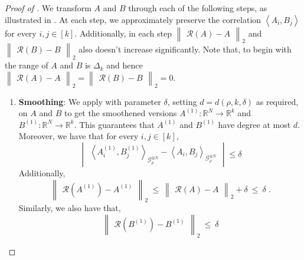 \documentclass[11pt]{article}
\newcommand{\inangle}[1]{\left \langle #1 \right \rangle}
\newcommand{\inabs}[1]{\begin{vmatrix} #1 \end{vmatrix}}
\newcommand{\norm}[2]{\begin{Vmatrix} #2 \end{Vmatrix}_{#1}}
\newcommand{\wtilde}[1]{\widetilde{#1}}
\newcommand{\bbR}{{\mathbb R}}
\newcommand{\calG}{\mathcal{G}}
\newcommand{\calR}{\mathcal{R}}
\begin{document}
\begin{proof}[Proof of ]
%
%
%

We transform $A$ and $B$ through each of the following steps, as illustrated in . At each step, we approximately preserve the correlation $\inangle{A_i, B_j}$ for every $i, j \in [k]$. Additionally, in each step $\norm{2}{\calR(A) - A}$ and $\norm{2}{\calR(B) - B}$ also doesn't increase significantly. Note that, to begin with the range of $A$ and $B$ is $\Delta_k$ and hence $\norm{2}{\calR(A) - A} = \norm{2}{\calR(B) - B} = 0$.

\begin{enumerate}
	\item {\bf Smoothing}: We apply  with parameter $\delta$, setting $d = d(\rho, k, \delta)$ as required, on $A$ and $B$ to get the smoothened versions $A^{(1)} : \bbR^N \to \bbR^k$ and $B^{(1)} : \bbR^N \to \bbR^k$. This guarantees that $A^{(1)}$ and $B^{(1)}$ have degree at most $d$. Moreover, we have that for every $i, j \in [k]$,
	\begin{equation}
	\inabs{\inangle{A^{(1)}_i, B^{(1)}_j}_{\calG_\rho^{\otimes N}} - \inangle{A_i, B_j}_{\calG_\rho^{\otimes N}}} \le \delta \label{eqn:GNIS-1}
	\end{equation}
	Additionally,
	\[ \norm{2}{\calR(A^{(1)}) - A^{(1)}} ~\le~ \norm{2}{\calR(A) - A} + \delta ~\le~ \delta\;.\]
	Similarly, we also have that,
	\[\norm{2}{\calR(B^{(1)}) - B^{(1)}} ~\le~ \delta\]
	

\end{enumerate}
\end{proof}
\end{document}

